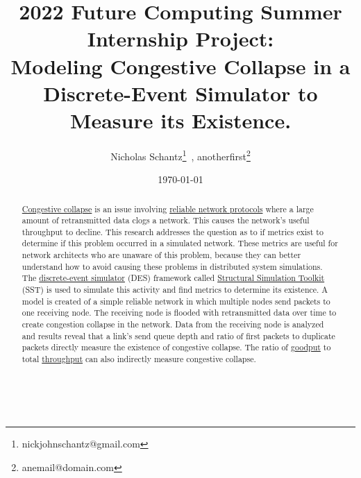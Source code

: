\documentclass{article}
\begin{document}
    \begin{minipage}[h]{\textwidth}
        \title{2022 Future Computing Summer Internship Project:\\Modeling Congestive Collapse in a Discrete-Event Simulator to Measure its Existence.}
        \author{Nicholas Schantz\footnote{nickjohnschantz@gmail.com}\ , 
        anotherfirst\footnote{anemail@domain.com}}
        \date{\today}
            \maketitle
        \begin{abstract}
            \href{https://en.wikipedia.org/wiki/Network_congestion#Congestive_collapse}{Congestive collapse} is an issue involving \href{https://en.wikipedia.org/wiki/Reliability_(computer_networking}{reliable network protocols} where a large amount of retransmitted data clogs a network. This causes the network's useful throughput to decline. This research addresses the question as to if metrics exist to determine if this problem occurred in a simulated network. These metrics are useful for network architects who are unaware of this problem, because they can better understand how to avoid causing these problems in distributed system simulations. The \href{https://en.wikipedia.org/wiki/Discrete-event_simulation}{discrete-event simulator} (DES) framework called \href{http://sst-simulator.org/}{Structural Simulation Toolkit} (SST) is used to simulate this activity and find metrics to determine its existence. A model is created of a simple reliable network in which multiple nodes send packets to one receiving node. The receiving node is flooded with retransmitted data over time to create congestion collapse in the network. Data from the receiving node is analyzed and results reveal that a link's send queue depth and ratio of first packets to duplicate packets directly measure the existence of congestive collapse. The ratio of \href{https://en.wikipedia.org/wiki/Goodput}{goodput} to total \href{https://en.wikipedia.org/wiki/Network_throughput}{throughput} can also indirectly measure congestive collapse.
        \end{abstract}
    \end{minipage}

\ \\

\end{document}
